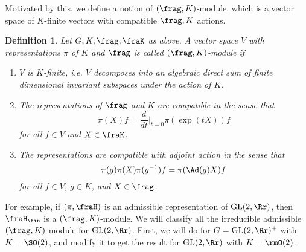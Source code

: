 \documentclass{article}
\newtheorem{definition}{Definition}[section]
\newcommand{\GL}{\mathrm{GL}}
\begin{document}
Motivated by this, we define a notion of $(\frag, K)$-module, which is a vector space of $K$-finite vectors with compatible $\frag, K$ actions.
\begin{definition}
Let $G, K, \frag, \fraK$ as above. A vector space $V$ with representations $\pi$ of $K$ and $\frag$ is called $(\frag, K)$-module if
\begin{enumerate}
\item $V$ is $K$-finite, i.e. $V$ decomposes into an algebraic direct sum of finite dimensional invariant subspaces under the action of $K$. 
\item The representations of $\frag$ and $K$ are compatible in the sense that 
$$
\pi(X)f = \frac{d}{dt}\Big|_{t=0} \pi(\exp(tX))f
$$
for all $f\in V$ and $X\in \fraK$. 
\item The representations are compatible with adjoint action in the sense that
$$
\pi(g) \pi(X)\pi(g^{-1}) f = \pi(\Ad(g)X)f
$$
for all $f\in V$, $g\in K$, and $X\in \frag$.
\end{enumerate}
\end{definition}


For example, if $(\pi, \fraH)$ is an admissible representation of $\GL(2, \Rr)$, then $\fraH_{\fin}$ is a $(\frag, K)$-module. 
We will classify all the irreducible admissible $(\frag, K)$-module for $\GL(2, \Rr)$.
First, we will do for $G = \GL(2, \Rr)^{+}$ with $K = \SO(2)$, and modify it to get the result for $\GL(2, \Rr)$ with $K = \rmO(2)$. 
\end{document}

